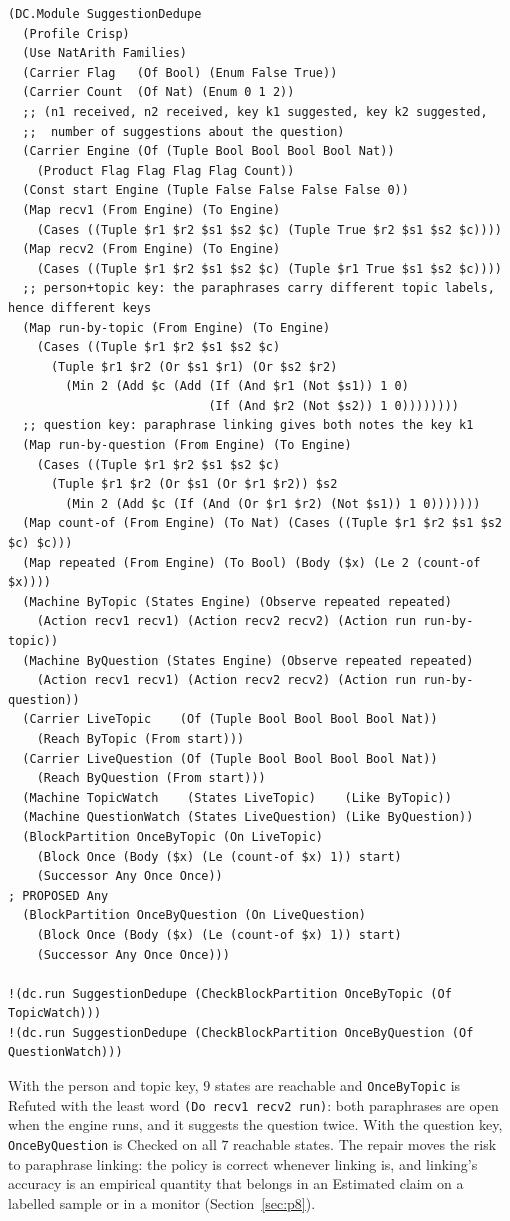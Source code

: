 \documentclass[11pt]{article}
\newcommand{\code}[1]{\texttt{#1}}
\theoremstyle{definition}
\theoremstyle{plain}
\begin{document}
\begin{lstlisting}[style=mettamod]
(DC.Module SuggestionDedupe
  (Profile Crisp)
  (Use NatArith Families)
  (Carrier Flag   (Of Bool) (Enum False True))
  (Carrier Count  (Of Nat) (Enum 0 1 2))
  ;; (n1 received, n2 received, key k1 suggested, key k2 suggested,
  ;;  number of suggestions about the question)
  (Carrier Engine (Of (Tuple Bool Bool Bool Bool Nat))
    (Product Flag Flag Flag Flag Count))
  (Const start Engine (Tuple False False False False 0))
  (Map recv1 (From Engine) (To Engine)
    (Cases ((Tuple $r1 $r2 $s1 $s2 $c) (Tuple True $r2 $s1 $s2 $c))))
  (Map recv2 (From Engine) (To Engine)
    (Cases ((Tuple $r1 $r2 $s1 $s2 $c) (Tuple $r1 True $s1 $s2 $c))))
  ;; person+topic key: the paraphrases carry different topic labels, hence different keys
  (Map run-by-topic (From Engine) (To Engine)
    (Cases ((Tuple $r1 $r2 $s1 $s2 $c)
      (Tuple $r1 $r2 (Or $s1 $r1) (Or $s2 $r2)
        (Min 2 (Add $c (Add (If (And $r1 (Not $s1)) 1 0)
                            (If (And $r2 (Not $s2)) 1 0))))))))
  ;; question key: paraphrase linking gives both notes the key k1
  (Map run-by-question (From Engine) (To Engine)
    (Cases ((Tuple $r1 $r2 $s1 $s2 $c)
      (Tuple $r1 $r2 (Or $s1 (Or $r1 $r2)) $s2
        (Min 2 (Add $c (If (And (Or $r1 $r2) (Not $s1)) 1 0)))))))
  (Map count-of (From Engine) (To Nat) (Cases ((Tuple $r1 $r2 $s1 $s2 $c) $c)))
  (Map repeated (From Engine) (To Bool) (Body ($x) (Le 2 (count-of $x))))
  (Machine ByTopic (States Engine) (Observe repeated repeated)
    (Action recv1 recv1) (Action recv2 recv2) (Action run run-by-topic))
  (Machine ByQuestion (States Engine) (Observe repeated repeated)
    (Action recv1 recv1) (Action recv2 recv2) (Action run run-by-question))
  (Carrier LiveTopic    (Of (Tuple Bool Bool Bool Bool Nat))
    (Reach ByTopic (From start)))
  (Carrier LiveQuestion (Of (Tuple Bool Bool Bool Bool Nat))
    (Reach ByQuestion (From start)))
  (Machine TopicWatch    (States LiveTopic)    (Like ByTopic))
  (Machine QuestionWatch (States LiveQuestion) (Like ByQuestion))
  (BlockPartition OnceByTopic (On LiveTopic)
    (Block Once (Body ($x) (Le (count-of $x) 1)) start)
    (Successor Any Once Once))                                          ; PROPOSED Any
  (BlockPartition OnceByQuestion (On LiveQuestion)
    (Block Once (Body ($x) (Le (count-of $x) 1)) start)
    (Successor Any Once Once)))

!(dc.run SuggestionDedupe (CheckBlockPartition OnceByTopic (Of TopicWatch)))
!(dc.run SuggestionDedupe (CheckBlockPartition OnceByQuestion (Of QuestionWatch)))
\end{lstlisting}
With the person and topic key, $9$ states are reachable and \code{OnceByTopic} is Refuted with the
least word \code{(Do recv1 recv2 run)}: both paraphrases are open when the engine runs, and it
suggests the question twice. With the question key, \code{OnceByQuestion} is Checked on all $7$
reachable states. The repair moves the risk to paraphrase linking: the policy is correct whenever
linking is, and linking's accuracy is an empirical quantity that belongs in an Estimated claim on
a labelled sample or in a monitor (Section~\ref{sec:p8}).
\end{document}
